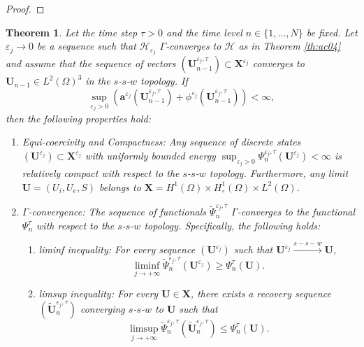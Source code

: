 \documentclass[a4paper,11pt]{article}
\newtheorem{theorem}{Theorem}[section]
\theoremstyle{definition}
\numberwithin{equation}{section}
\newcommand{\e}{\varepsilon}
\begin{document}
\begin{proof}
\end{proof}

\begin{theorem} 
	\label{theorem:gamma}
	Let the time step $\tau > 0$ and the time level $n \in \{1, \dots, N\}$ be fixed. Let $\e_j \to 0$ be a sequence such that $\mathcal H_{\e_j}$ $\Gamma$-converges to $\mathcal H$ as in Theorem \ref{th:ac04} and assume that the sequence of vectors $(\mathbf{U}_{n-1}^{\e_j,\tau}) \subset \mathbf{X}^{\e_j}$ converges to $\mathbf{U}_{n-1} \in L^2(\Omega)^3$ in the $s$-$s$-$w$ topology. If
	\begin{equation}
		\label{eq:ASn-1}
		\sup_{\e_j>0} \left(  \mathbf{a}^{\e_j}(\mathbf{U}_{n-1}^{\e_j,\tau}) + \phi^{\e_j}(\mathbf{U}_{n-1}^{\e_j,\tau}) \right) < \infty,
	\end{equation}
	then the following properties hold:
	\begin{enumerate}
		\item[(I)] Equi-coercivity and Compactness: Any sequence of discrete states $(\mathbf{U}^{\e_j}) \subset \mathbf{X}^{\e_j}$ with uniformly bounded energy $\sup_{\e_j > 0} \Psi_n^{\e_j, \tau}(\mathbf{U}^{\e_j}) < \infty$ is relatively compact with respect to the $s$-$s$-$w$ topology. Furthermore, any limit $\mathbf{U} = (U_i, U_e, S)$ belongs to $\mathbf{X}= H^1(\Omega) \times H_\circ^1(\Omega) \times L^2(\Omega)$. 
		\item[(II)] $\Gamma$-convergence: The sequence of functionals $\widetilde\Psi_n^{\e_j, \tau}$ $\Gamma$-converges to the functional $\Psi_n^\tau$ with respect to the $s$-$s$-$w$ topology. Specifically, the following holds:
		\begin{enumerate}
			\item liminf inequality: For every sequence $(\mathbf{U}^{\e_j})$ such that $\mathbf{U}^{\e_j} \xrightarrow{s-s-w} \mathbf{U}$,
			\begin{equation*}
				\liminf_{j \to +\infty} \widetilde\Psi_n^{\e_j, \tau}(\mathbf{U}^{\e_j}) \ge \Psi_n^\tau(\mathbf{U}).
			\end{equation*}
			\item limsup inequality: For every $\mathbf{U} \in \mathbf{X}$, there exists a recovery sequence $(\widetilde{\mathbf{U}}_n^{\e_j,\tau})$ converging $s$-$s$-$w$ to $\mathbf{U}$ such that
			\begin{equation*}
				\limsup_{j \to +\infty} \widetilde\Psi_n^{\e_j, \tau}(\widetilde{\mathbf{U}}_n^{\e_j,\tau}) \le \Psi_n^\tau(\mathbf{U}).
			\end{equation*}
		\end{enumerate}
	\end{enumerate}
\end{theorem}
\end{document}
